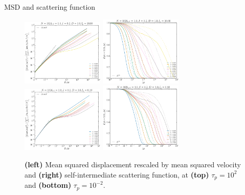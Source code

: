 \documentclass{beamer}
\begin{document}
\begin{frame}{MSD and scattering function}

\begin{figure}
\centering
\includegraphics[width=0.35\textwidth]{msdv2_No1024_Tl1000_Rj1000.eps}
\includegraphics[width=0.35\textwidth]{Fs_No1024_Tl1000_Rj1000.eps}\\
\includegraphics[width=0.35\textwidth]{msdv2_No1024_Tl1000_Rn1000.eps}
\includegraphics[width=0.35\textwidth]{Fs_No1024_Tl1000_Rn1000.eps}
\caption{{\bf (left)} Mean squared displacement rescaled by mean squared velocity and {\bf (right)} self-intermediate scattering function, at {\bf (top)} $\tau_p = 10^2$ and {\bf (bottom)} $\tau_p = 10^{-2}$.}
\end{figure}

\end{frame}
\end{document}
